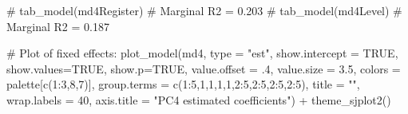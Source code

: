 \documentclass[
  letterpaper,
  DIV=11,
  numbers=noendperiod]{scrreprt}
\newenvironment{Shaded}{\begin{snugshade}}{\end{snugshade}}
\newcommand{\AttributeTok}[1]{\textcolor[rgb]{0.40,0.45,0.13}{#1}}
\newcommand{\CommentTok}[1]{\textcolor[rgb]{0.37,0.37,0.37}{#1}}
\newcommand{\ConstantTok}[1]{\textcolor[rgb]{0.56,0.35,0.01}{#1}}
\newcommand{\DecValTok}[1]{\textcolor[rgb]{0.68,0.00,0.00}{#1}}
\newcommand{\FloatTok}[1]{\textcolor[rgb]{0.68,0.00,0.00}{#1}}
\newcommand{\FunctionTok}[1]{\textcolor[rgb]{0.28,0.35,0.67}{#1}}
\newcommand{\NormalTok}[1]{\textcolor[rgb]{0.00,0.23,0.31}{#1}}
\newcommand{\SpecialCharTok}[1]{\textcolor[rgb]{0.37,0.37,0.37}{#1}}
\newcommand{\StringTok}[1]{\textcolor[rgb]{0.13,0.47,0.30}{#1}}
\begin{document}
\begin{Shaded}
\begin{Highlighting}[]
\CommentTok{\# tab\_model(md4Register) \# Marginal R2 = 0.203}
\CommentTok{\# tab\_model(md4Level) \# Marginal R2 = 0.187}

\CommentTok{\# Plot of fixed effects:}
\FunctionTok{plot\_model}\NormalTok{(md4, }
           \AttributeTok{type =} \StringTok{"est"}\NormalTok{,}
           \AttributeTok{show.intercept =} \ConstantTok{TRUE}\NormalTok{,}
           \AttributeTok{show.values=}\ConstantTok{TRUE}\NormalTok{, }
           \AttributeTok{show.p=}\ConstantTok{TRUE}\NormalTok{,}
           \AttributeTok{value.offset =}\NormalTok{ .}\DecValTok{4}\NormalTok{,}
           \AttributeTok{value.size =} \FloatTok{3.5}\NormalTok{,}
           \AttributeTok{colors =}\NormalTok{ palette[}\FunctionTok{c}\NormalTok{(}\DecValTok{1}\SpecialCharTok{:}\DecValTok{3}\NormalTok{,}\DecValTok{8}\NormalTok{,}\DecValTok{7}\NormalTok{)],}
           \AttributeTok{group.terms =} \FunctionTok{c}\NormalTok{(}\DecValTok{1}\SpecialCharTok{:}\DecValTok{5}\NormalTok{,}\DecValTok{1}\NormalTok{,}\DecValTok{1}\NormalTok{,}\DecValTok{1}\NormalTok{,}\DecValTok{1}\NormalTok{,}\DecValTok{2}\SpecialCharTok{:}\DecValTok{5}\NormalTok{,}\DecValTok{2}\SpecialCharTok{:}\DecValTok{5}\NormalTok{,}\DecValTok{2}\SpecialCharTok{:}\DecValTok{5}\NormalTok{,}\DecValTok{2}\SpecialCharTok{:}\DecValTok{5}\NormalTok{), }
           \AttributeTok{title =} \StringTok{""}\NormalTok{,}
           \AttributeTok{wrap.labels =} \DecValTok{40}\NormalTok{,}
           \AttributeTok{axis.title =} \StringTok{"PC4 estimated coefficients"}\NormalTok{) }\SpecialCharTok{+}
  \FunctionTok{theme\_sjplot2}\NormalTok{() }
\end{Highlighting}
\end{Shaded}
\end{document}
